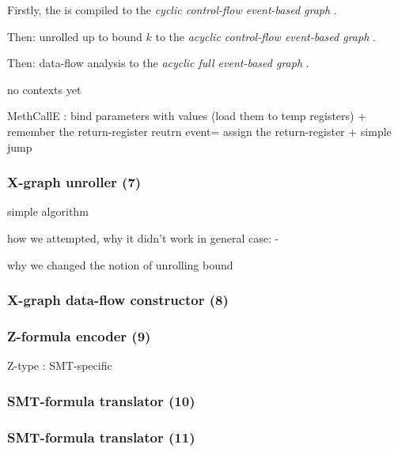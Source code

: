 Firstly, the \ytree{} is compiled to the \textit{cyclic control-flow event-based graph} \xgraph[CF].

Then: unrolled up to bound $k$ to the \textit{acyclic control-flow event-based graph} \xgraphU[CF].

Then: data-flow analysis to the \textit{acyclic full event-based graph} \xgraphU[CF+DF].

no contexts yet

MethCallE : bind parameters with values (load them to temp registers) + remember the return-register
reutrn event= assign the return-register + simple jump


\subsubsection{X-graph unroller (7)}
\label{ch:impl:proc:x-unroll}

simple algorithm

how we attempted, why it didn't work in general case:
- 

why we changed the notion of unrolling bound


\subsubsection{X-graph data-flow constructor (8)}
\label{ch:impl:proc:x-df}%


\subsubsection{Z-formula encoder (9)}
\label{ch:impl:proc:z-encoder}

Z-type : SMT-specific

\subsubsection{SMT-formula translator (10)}
\label{ch:impl:proc:smt-transator}%

\subsubsection{SMT-formula translator (11)}
\label{ch:impl:proc:smt-solver}%


